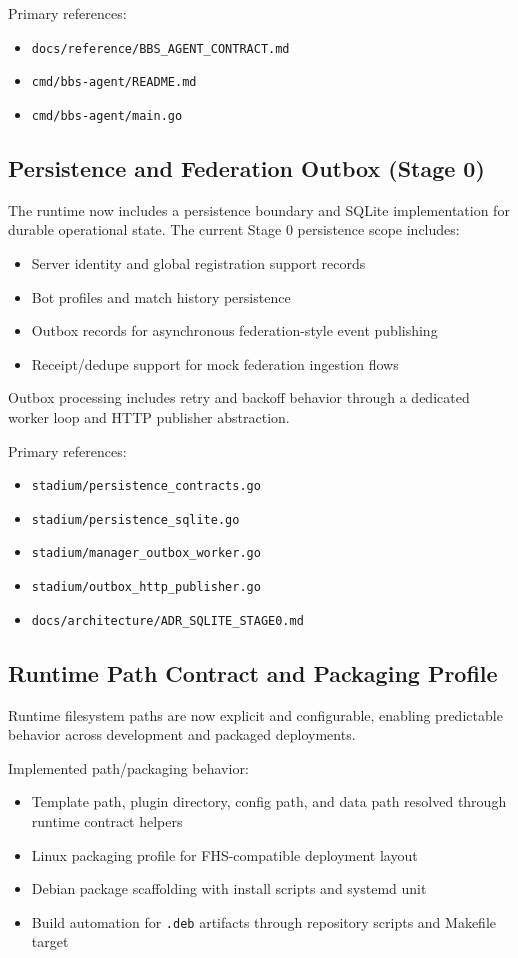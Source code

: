 \documentclass[11pt]{article}
\begin{document}
Primary references:
\begin{itemize}[leftmargin=*]
  \item \texttt{docs/reference/BBS\_AGENT\_CONTRACT.md}
  \item \texttt{cmd/bbs-agent/README.md}
  \item \texttt{cmd/bbs-agent/main.go}
\end{itemize}

\subsection{Persistence and Federation Outbox (Stage 0)}
The runtime now includes a persistence boundary and SQLite implementation for durable operational state. The current Stage 0 persistence scope includes:
\begin{itemize}[leftmargin=*]
  \item Server identity and global registration support records
  \item Bot profiles and match history persistence
  \item Outbox records for asynchronous federation-style event publishing
  \item Receipt/dedupe support for mock federation ingestion flows
\end{itemize}

Outbox processing includes retry and backoff behavior through a dedicated worker loop and HTTP publisher abstraction.

Primary references:
\begin{itemize}[leftmargin=*]
  \item \texttt{stadium/persistence\_contracts.go}
  \item \texttt{stadium/persistence\_sqlite.go}
  \item \texttt{stadium/manager\_outbox\_worker.go}
  \item \texttt{stadium/outbox\_http\_publisher.go}
  \item \texttt{docs/architecture/ADR\_SQLITE\_STAGE0.md}
\end{itemize}

\subsection{Runtime Path Contract and Packaging Profile}
Runtime filesystem paths are now explicit and configurable, enabling predictable behavior across development and packaged deployments.

Implemented path/packaging behavior:
\begin{itemize}[leftmargin=*]
  \item Template path, plugin directory, config path, and data path resolved through runtime contract helpers
  \item Linux packaging profile for FHS-compatible deployment layout
  \item Debian package scaffolding with install scripts and systemd unit
  \item Build automation for \texttt{.deb} artifacts through repository scripts and Makefile target
\end{itemize}
\end{document}
